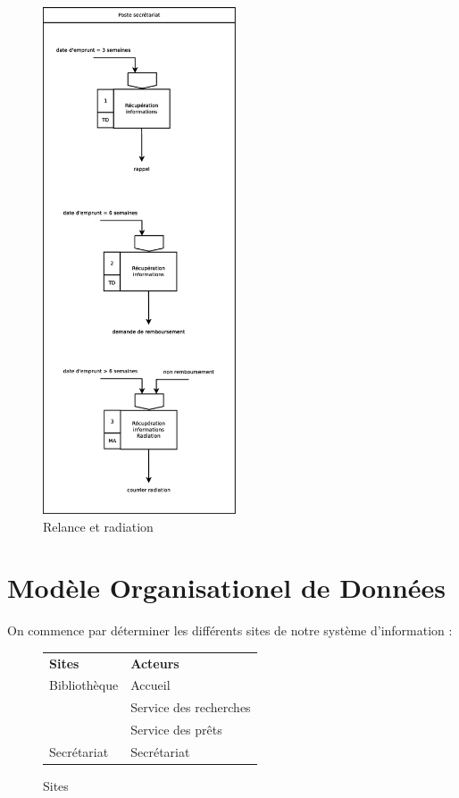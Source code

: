 \begin{figure}[!htb]
    \begin{center}
    \includegraphics[height=15cm]{images/cc1_mot4.eps}
    \caption{\label{cc1_mot4} Relance et radiation}
    \end{center}
\end{figure}

\newpage
\section*{Modèle Organisationel de Données}

On commence par déterminer les différents sites de notre système d'information :\\

\begin{figure}[!h]
\begin{tabular}{l l}
%
    \textbf{Sites} & \textbf{Acteurs} \\
    Bibliothèque & Accueil \\
                 & Service des recherches \\
                 & Service des prêts \\
    Secrétariat  & Secrétariat \\
%
\end{tabular}
    \caption{\label{sites} Sites}
\end{figure}

